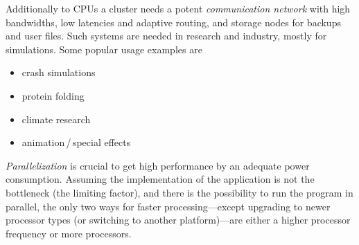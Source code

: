 Additionally to CPUs a cluster needs a potent \emph{communication network} with high bandwidths, low latencies and adaptive routing, and storage nodes for backups and user files.
%
%
Such systems are needed in research and industry, mostly for simulations.
Some popular usage examples are
%
\begin{multicols}{2}
\begin{itemize}
	\item crash simulations
	\item protein folding
	\item climate research
	\item animation\,/\,special effects
\end{itemize}
\end{multicols}
%
\noindent
\emph{Parallelization} is crucial to get high performance by an adequate power consumption. Assuming the implementation of the application is not the bottleneck (the limiting factor), and there is the possibility to run the program in parallel, the only two ways for faster processing---except upgrading to newer processor types (or switching to another platform)---are either a higher processor frequency or more processors.

